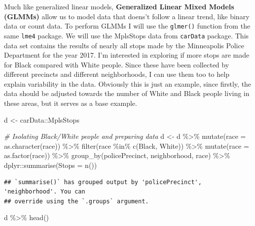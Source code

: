 \documentclass[
]{book}
\newenvironment{Shaded}{\begin{snugshade}}{\end{snugshade}}
\newcommand{\AttributeTok}[1]{\textcolor[rgb]{0.77,0.63,0.00}{#1}}
\newcommand{\CommentTok}[1]{\textcolor[rgb]{0.56,0.35,0.01}{\textit{#1}}}
\newcommand{\FunctionTok}[1]{\textcolor[rgb]{0.00,0.00,0.00}{#1}}
\newcommand{\NormalTok}[1]{#1}
\newcommand{\OtherTok}[1]{\textcolor[rgb]{0.56,0.35,0.01}{#1}}
\newcommand{\SpecialCharTok}[1]{\textcolor[rgb]{0.00,0.00,0.00}{#1}}
\newcommand{\StringTok}[1]{\textcolor[rgb]{0.31,0.60,0.02}{#1}}
\begin{document}
Much like generalized linear models, \textbf{Generalized Linear Mixed Models (GLMMs)} allow us to model data that doens't follow a linear trend, like binary data or count data.
To perform GLMMs I will use the \texttt{glmer()} function from the same \texttt{lme4} package. We will use the MplsStops data from \texttt{carData} package. This data set contains the results of nearly all stops made by the Minneapolis Police Department for the year 2017. I'm interested in exploring if more stops are made for Black compared with White people. Since these have been collected by different precincts and different neighborhoods, I can use them too to help explain variability in the data. Obviously this is just an example, since firstly, the data should be adjusted towards the number of White and Black people living in these areas, but it serves as a base example.

\begin{Shaded}
\begin{Highlighting}[]
\NormalTok{d }\OtherTok{\textless{}{-}}\NormalTok{ carData}\SpecialCharTok{::}\NormalTok{MplsStops }

\CommentTok{\# Isolating Black/White people and preparing data}
\NormalTok{d }\OtherTok{\textless{}{-}}\NormalTok{ d }\SpecialCharTok{\%\textgreater{}\%} 
  \FunctionTok{mutate}\NormalTok{(}\AttributeTok{race =} \FunctionTok{as.character}\NormalTok{(race)) }\SpecialCharTok{\%\textgreater{}\%} 
  \FunctionTok{filter}\NormalTok{(race }\SpecialCharTok{\%in\%} \FunctionTok{c}\NormalTok{(}\StringTok{\textquotesingle{}Black\textquotesingle{}}\NormalTok{, }\StringTok{\textquotesingle{}White\textquotesingle{}}\NormalTok{)) }\SpecialCharTok{\%\textgreater{}\%} 
  \FunctionTok{mutate}\NormalTok{(}\AttributeTok{race =} \FunctionTok{as.factor}\NormalTok{(race)) }\SpecialCharTok{\%\textgreater{}\%} 
  \FunctionTok{group\_by}\NormalTok{(policePrecinct, neighborhood, race) }\SpecialCharTok{\%\textgreater{}\%} 
\NormalTok{  dplyr}\SpecialCharTok{::}\FunctionTok{summarise}\NormalTok{(}\AttributeTok{Stops =} \FunctionTok{n}\NormalTok{())}
\end{Highlighting}
\end{Shaded}

\begin{verbatim}
## `summarise()` has grouped output by 'policePrecinct', 'neighborhood'. You can
## override using the `.groups` argument.
\end{verbatim}

\begin{Shaded}
\begin{Highlighting}[]
\NormalTok{d }\SpecialCharTok{\%\textgreater{}\%} 
  \FunctionTok{head}\NormalTok{()}
\end{Highlighting}
\end{Shaded}
\end{document}
